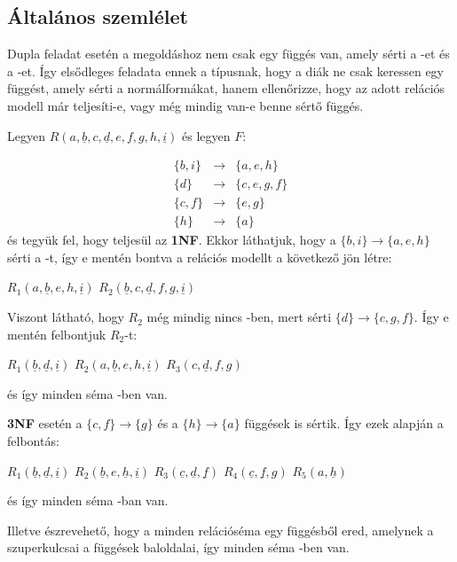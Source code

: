 \subsection{Általános szemlélet}
Dupla feladat esetén a megoldáshoz nem csak egy függés van, amely sérti a \nfk-et és a \nfh-et. Így elsődleges feladata ennek a típusnak, hogy a diák ne csak keressen egy függést, amely sérti a normálformákat, hanem ellenőrizze, hogy az adott relációs modell már teljesíti-e, vagy még mindig van-e benne sértő függés.
\begin{pld}
    Legyen $R(a,\underline{b},c,\underline{d},e,f,g,h,\underline{i})$ és legyen $F$:

    $$
    \begin{matrix}
    \{b,i\} & \longrightarrow & \{a,e,h\}\\
    \{d\} & \longrightarrow &  \{c,e,g,f\} \\
    \{c,f\}  & \longrightarrow & \{e,g\} \\
    \{h\}  & \longrightarrow &\{a\} 
    \end{matrix}
    $$
    és tegyük fel, hogy teljesül az \textbf{1NF}. Ekkor láthatjuk, hogy a  $\{b,i\} \longrightarrow \{a,e,h\}$ sérti a \nfk-t, így e mentén bontva a relációs modellt a következő jön létre:
    \begin{center}
        $R_1(a,\underline{b},e,h,\underline{i})$ \break
        $R_2(\underline{b},c,\underline{d},f,g,\underline{i})$
    \end{center}
    Viszont látható, hogy $R_2$ még mindig nincs \nfk-ben, mert sérti $\{d\} \longrightarrow \{c,g,f\}$. Így e mentén felbontjuk $R_2$-t:
    \begin{center}
        $R_1(\underline{b},\underline{d},\underline{i})$\break
        $R_2(a,\underline{b},e,h,\underline{i})$ \break
        $R_3(c,\underline{d},f,g)$\break
    \end{center}
    és így minden séma \nfk-ben van.\par
    \textbf{3NF} esetén a $\{c,f\} \longrightarrow \{g\}$ és a $\{h\} \longrightarrow \{a\}$ függések is sértik. Így ezek alapján a felbontás:
    \begin{center}
        $R_1(\underline{b},\underline{d},\underline{i})$\break
        $R_2(\underline{b},e,\underline{h},\underline{i})$ \break
        $R_3(\underline{c},\underline{d},\underline{f})$\break
        $R_4(\underline{c},\underline{f},g)$\break
        $R_5(a,\underline{h})$\break
    \end{center}
    és így minden séma \nfh-ban van.\par
    Illetve észrevehető, hogy a minden relációséma egy függésből ered, amelynek a szuperkulcsai a függések baloldalai, így minden séma \BCNF-ben van.
\end{pld}

